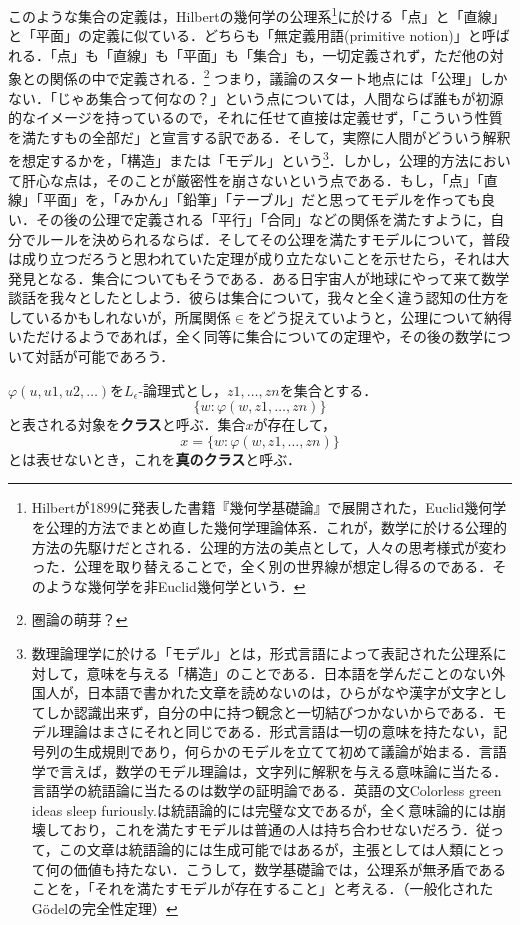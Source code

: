 \documentclass[uplatex, 12pt, a4paper, dvipdfmx]{jsreport}
\begin{document}
このような集合の定義は，Hilbertの幾何学の公理系\footnote{Hilbertが1899に発表した書籍『幾何学基礎論』で展開された，Euclid幾何学を公理的方法でまとめ直した幾何学理論体系．これが，数学に於ける公理的方法の先駆けだとされる．公理的方法の美点として，人々の思考様式が変わった．公理を取り替えることで，全く別の世界線が想定し得るのである．そのような幾何学を非Euclid幾何学という．}に於ける「点」と「直線」と「平面」の定義に似ている．どちらも「無定義用語(primitive notion)」と呼ばれる．「点」も「直線」も「平面」も「集合」も，一切定義されず，ただ他の対象との関係の中で定義される．\footnote{圏論の萌芽？} つまり，議論のスタート地点には「公理」しかない．「じゃあ集合って何なの？」という点については，人間ならば誰もが初源的なイメージを持っているので，それに任せて直接は定義せず，「こういう性質を満たすもの全部だ」と宣言する訳である．そして，実際に人間がどういう解釈を想定するかを，「構造」または「モデル」という\footnote{数理論理学に於ける「モデル」とは，形式言語によって表記された公理系に対して，意味を与える「構造」のことである．日本語を学んだことのない外国人が，日本語で書かれた文章を読めないのは，ひらがなや漢字が文字としてしか認識出来ず，自分の中に持つ観念と一切結びつかないからである．モデル理論はまさにそれと同じである．形式言語は一切の意味を持たない，記号列の生成規則であり，何らかのモデルを立てて初めて議論が始まる．言語学で言えば，数学のモデル理論は，文字列に解釈を与える意味論に当たる．言語学の統語論に当たるのは数学の証明論である．英語の文Colorless green ideas sleep furiously.は統語論的には完璧な文であるが，全く意味論的には崩壊しており，これを満たすモデルは普通の人は持ち合わせないだろう．従って，この文章は統語論的には生成可能ではあるが，主張としては人類にとって何の価値も持たない．こうして，数学基礎論では，公理系が無矛盾であることを，「それを満たすモデルが存在すること」と考える．（一般化されたGödelの完全性定理）}．しかし，公理的方法において肝心な点は，そのことが厳密性を崩さないという点である．もし，「点」「直線」「平面」を，「みかん」「鉛筆」「テーブル」だと思ってモデルを作っても良い．その後の公理で定義される「平行」「合同」などの関係を満たすように，自分でルールを決められるならば．そしてその公理を満たすモデルについて，普段は成り立つだろうと思われていた定理が成り立たないことを示せたら，それは大発見となる．集合についてもそうである．ある日宇宙人が地球にやって来て数学談話を我々としたとしよう．彼らは集合について，我々と全く違う認知の仕方をしているかもしれないが，所属関係$\in$をどう捉えていようと，公理について納得いただけるようであれば，全く同等に集合についての定理や，その後の数学について対話が可能であろう．

\begin{shadebox}\begin{definition}[クラス(ZF)]
	$\varphi (u,u1,u2,\dots)$を$L_\epsilon$-論理式とし，$z1,\dots,zn$を集合とする．$$\{w:\varphi (w,z1,\dots,zn)\}$$と表される対象を\textbf{クラス}と呼ぶ．集合$x$が存在して，$$x=\{w:\varphi (w,z1,\dots,zn)\}$$とは表せないとき，これを\textbf{真のクラス}と呼ぶ．
\end{definition}\end{shadebox}
\end{document}
